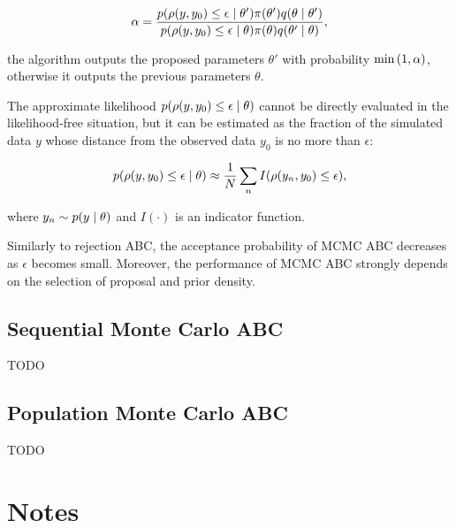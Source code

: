 \begin{equation}
    \alpha = \frac{p \qty(\rho \qty(y, y_0 ) \leq \epsilon \mid \theta') \pi\qty(\theta') q \qty(\theta \mid \theta')  }{p \qty(\rho \qty(y, y_0) \leq \epsilon \mid \theta) \pi\qty(\theta) q \qty(\theta' \mid \theta) },
\end{equation}

the algorithm outputs the proposed parameters $\theta'$ with probability $\min \qty(1, \alpha)$, otherwise it outputs the previous parameters $\theta$. 

The approximate likelihood $p \qty(\rho \qty(y, y_0 ) \leq \epsilon \mid \theta)$ cannot be directly evaluated in the likelihood-free situation, but it can be estimated as the fraction of the simulated data $y$ whose distance from the observed data $y_0$ is no more than $\epsilon$:

\begin{equation}
    p \qty(\rho \qty(y, y_0) \leq \epsilon \mid \theta) \approx \frac{1}{N} \sum_n I \qty(\rho \qty(y_n, y_0) \leq \epsilon),
\end{equation}

where $y_n \sim p \qty(y \mid \theta)$ and $I(\cdot)$ is an indicator function. %

Similarly to rejection ABC, the acceptance probability of MCMC ABC decreases as $\epsilon$ becomes small. Moreover, the performance of MCMC ABC strongly depends on the selection of proposal and prior density.

\subsection{Sequential Monte Carlo ABC}\label{sec:smc_abc}

TODO

\subsection{Population Monte Carlo ABC}\label{sec:pmc_abc}

TODO

\section{Notes}

